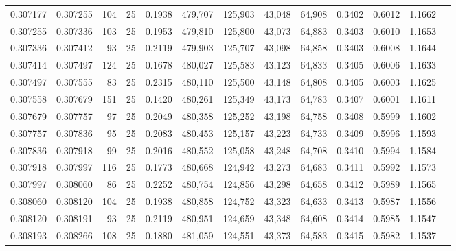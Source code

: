 \begin{tabular}{rrrrrrrrrrrrr}
0.307177 & 0.307255 &   104 &  25 &                                     0.1938 & 479,707 & 125,903 &  43,048 &  64,908 & 0.3402 & 0.6012 & 1.1662 \\
0.307255 & 0.307336 &   103 &  25 &                                     0.1953 & 479,810 & 125,800 &  43,073 &  64,883 & 0.3403 & 0.6010 & 1.1653 \\
0.307336 & 0.307412 &    93 &  25 &                                     0.2119 & 479,903 & 125,707 &  43,098 &  64,858 & 0.3403 & 0.6008 & 1.1644 \\
0.307414 & 0.307497 &   124 &  25 &                                     0.1678 & 480,027 & 125,583 &  43,123 &  64,833 & 0.3405 & 0.6006 & 1.1633 \\
0.307497 & 0.307555 &    83 &  25 &                                     0.2315 & 480,110 & 125,500 &  43,148 &  64,808 & 0.3405 & 0.6003 & 1.1625 \\
0.307558 & 0.307679 &   151 &  25 &                                     0.1420 & 480,261 & 125,349 &  43,173 &  64,783 & 0.3407 & 0.6001 & 1.1611 \\
0.307679 & 0.307757 &    97 &  25 &                                     0.2049 & 480,358 & 125,252 &  43,198 &  64,758 & 0.3408 & 0.5999 & 1.1602 \\
0.307757 & 0.307836 &    95 &  25 &                                     0.2083 & 480,453 & 125,157 &  43,223 &  64,733 & 0.3409 & 0.5996 & 1.1593 \\
0.307836 & 0.307918 &    99 &  25 &                                     0.2016 & 480,552 & 125,058 &  43,248 &  64,708 & 0.3410 & 0.5994 & 1.1584 \\
0.307918 & 0.307997 &   116 &  25 &                                     0.1773 & 480,668 & 124,942 &  43,273 &  64,683 & 0.3411 & 0.5992 & 1.1573 \\
0.307997 & 0.308060 &    86 &  25 &                                     0.2252 & 480,754 & 124,856 &  43,298 &  64,658 & 0.3412 & 0.5989 & 1.1565 \\
0.308060 & 0.308120 &   104 &  25 &                                     0.1938 & 480,858 & 124,752 &  43,323 &  64,633 & 0.3413 & 0.5987 & 1.1556 \\
0.308120 & 0.308191 &    93 &  25 &                                     0.2119 & 480,951 & 124,659 &  43,348 &  64,608 & 0.3414 & 0.5985 & 1.1547 \\
0.308193 & 0.308266 &   108 &  25 &                                     0.1880 & 481,059 & 124,551 &  43,373 &  64,583 & 0.3415 & 0.5982 & 1.1537 \\

\end{tabular}
